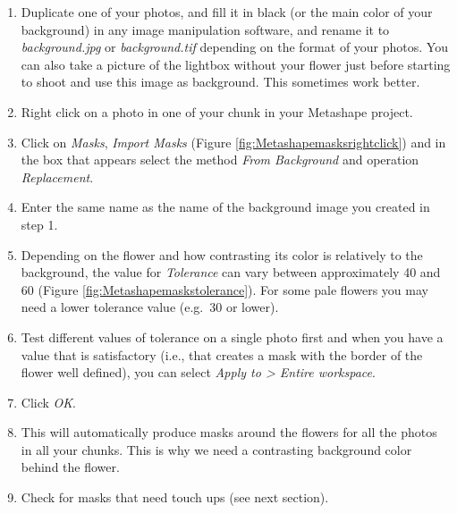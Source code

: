 \documentclass[
]{book}
\begin{document}
\begin{enumerate}
\def\labelenumi{\arabic{enumi}.}
\item
  Duplicate one of your photos, and fill it in black (or the main color of your
  background) in any image manipulation software, and rename it to \emph{background.jpg}
  or \emph{background.tif} depending on the format of your photos.
  You can also take a picture of the lightbox without your flower just before
  starting to shoot and use this image as background. This sometimes work better.
\item
  Right click on a photo in one of your chunk in your Metashape
  project.
\item
  Click on \emph{Masks}, \emph{Import Masks} (Figure \ref{fig:Metashapemasksrightclick}) and in the box that appears select the method \emph{From Background} and operation \emph{Replacement}.
\item
  Enter the same name as the name of the background image you created in step 1.
\item
  Depending on the flower and how contrasting its color is relatively to the background,
  the value for \emph{Tolerance} can vary between approximately 40 and 60 (Figure \ref{fig:Metashapemaskstolerance}).
  For some pale flowers you may need a lower tolerance value (e.g.~30 or lower).
\item
  Test different values of tolerance on a single photo first and when
  you have a value that is satisfactory (i.e., that creates a mask with the
  border of the flower well defined), you can select \emph{Apply to \textgreater{} Entire workspace}.
\item
  Click \emph{OK}.
\item
  This will automatically produce masks around the flowers for all the
  photos in all your chunks. This is why we need a contrasting background color
  behind the flower.
\item
  Check for masks that need touch ups (see next section).
\end{enumerate}
\end{document}
